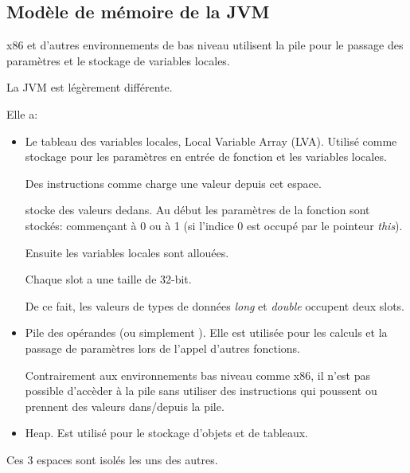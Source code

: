 \subsection{Modèle de mémoire de la \ac{JVM}}

x86 et d'autres environnements de bas niveau utilisent la pile pour le passage des
paramètres et le stockage de variables locales.

La \ac{JVM} est légèrement différente.

Elle a:

\begin{itemize}
\item Le tableau des variables locales, Local Variable Array (\ac{LVA}).
Utilisé comme stockage pour les paramètres en entrée de fonction et les variables
locales.

Des instructions comme  charge une valeur depuis cet espace.

 stocke des valeurs dedans.
Au début les paramètres de la fonction sont stockés: commençant à 0 ou à 1 (si l'indice
0 est occupé par le pointeur \emph{this}).

Ensuite les variables locales sont allouées.


Chaque slot a une taille de 32-bit.

De ce fait, les valeurs de types de données \emph{long} et \emph{double} occupent
deux slots.


\item Pile des opérandes (ou simplement ).
Elle est utilisée pour les calculs et la passage de paramètres lors de l'appel d'autres
fonctions.

Contrairement aux environnements bas niveau comme x86, il n'est pas possible d'accèder
à la pile sans utiliser des instructions qui poussent ou prennent des valeurs dans/depuis
la pile.


\item Heap. Est utilisé pour le stockage d'objets et de tableaux.

\end{itemize}

Ces 3 espaces sont isolés les uns des autres.

